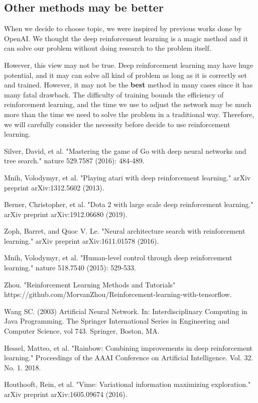 \documentclass[12pt]{article}
\begin{document}
\subsection{Other methods may be better}
When we decide to choose topic, we were inspired by previous works done by OpenAI. We thought the deep reinforcement learning is a magic method and it can solve our problem without doing research to the problem itself. 

However, this view may not be true. Deep reinforcement learning may have huge potential, and it may can solve all kind of problem as long as it is correctly set and trained. However, it may not be the \textbf{best} method in many cases since it has many fatal drawback. The difficulty of training bounds the efficiency of reinforcement learning, and the time we use to adjust the network may be much more than the time we need to solve the problem in a traditional way. Therefore, we will carefully consider the necessity before decide to use reinforcement learning.


\begin{thebibliography}{99}
	Silver, David, et al. "Mastering the game of Go with deep neural networks and tree search." nature 529.7587 (2016): 484-489.

	Mnih, Volodymyr, et al. "Playing atari with deep reinforcement learning." arXiv preprint arXiv:1312.5602 (2013).

	Berner, Christopher, et al. "Dota 2 with large scale deep reinforcement learning." arXiv preprint arXiv:1912.06680 (2019).

    Zoph, Barret, and Quoc V. Le. "Neural architecture search with reinforcement learning." arXiv preprint arXiv:1611.01578 (2016).

    Mnih, Volodymyr, et al. "Human-level control through deep reinforcement learning." nature 518.7540 (2015): 529-533.

    Zhou. "Reinforcement Learning Methods and Tutorials" https://github.com/MorvanZhou/Reinforcement-learning-with-tensorflow.

    Wang SC. (2003) Artificial Neural Network. In: Interdisciplinary Computing in Java Programming. The Springer International Series in Engineering and Computer Science, vol 743. Springer, Boston, MA.

    Hessel, Matteo, et al. "Rainbow: Combining improvements in deep reinforcement learning." Proceedings of the AAAI Conference on Artificial Intelligence. Vol. 32. No. 1. 2018.

    Houthooft, Rein, et al. "Vime: Variational information maximizing exploration." arXiv preprint arXiv:1605.09674 (2016).
\end{thebibliography}
\end{document}
